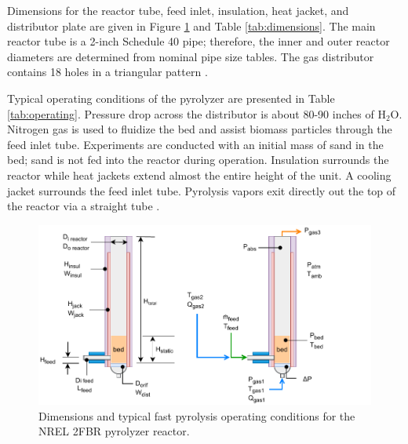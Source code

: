 Dimensions for the reactor tube, feed inlet, insulation, heat jacket, and distributor plate are given in Figure \ref{fig:pyrolyzer2} and Table \ref{tab:dimensions}. The main reactor tube is a 2-inch Schedule 40 pipe; therefore, the inner and outer reactor diameters are determined from nominal pipe size tables. The gas distributor contains 18 holes in a triangular pattern \cite{French-2019}.

Typical operating conditions of the pyrolyzer are presented in Table \ref{tab:operating}. Pressure drop across the distributor is about 80-90 inches of H$_2$O. Nitrogen gas is used to fluidize the bed and assist biomass particles through the feed inlet tube. Experiments are conducted with an initial mass of sand in the bed; sand is not fed into the reactor during operation. Insulation surrounds the reactor while heat jackets extend almost the entire height of the unit. A cooling jacket surrounds the feed inlet tube. Pyrolysis vapors exit directly out the top of the reactor via a straight tube \cite{French-2019}.

\begin{figure}[H]
    \centering
    \includegraphics[width=\textwidth]{figures/pyrolyzer2.pdf}
    \caption{Dimensions and typical fast pyrolysis operating conditions for the NREL 2FBR pyrolyzer reactor.}
    \label{fig:pyrolyzer2}
\end{figure}

